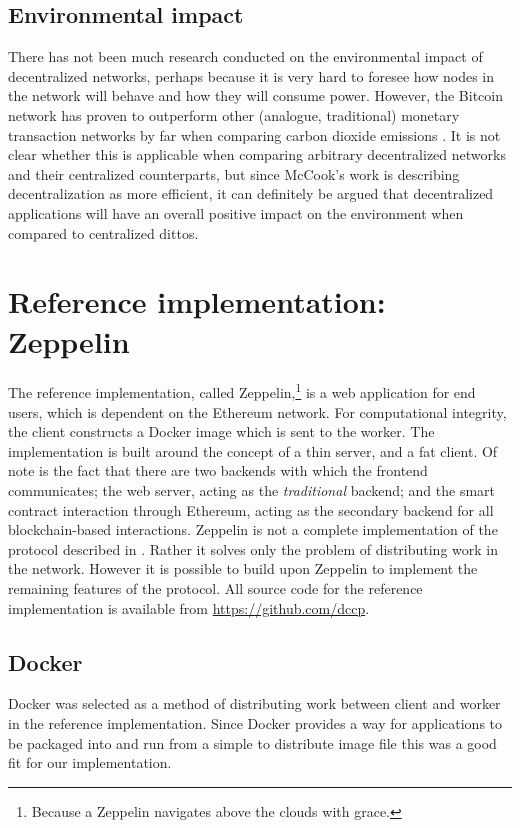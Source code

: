 \subsection{Environmental impact}
There has not been much research conducted on the environmental impact of decentralized networks, perhaps because it is very hard to foresee how nodes in the network will behave and how they will consume power. However, the Bitcoin network has proven to outperform other (analogue, traditional) monetary transaction networks by far when comparing carbon dioxide emissions \cite{cook}. It is not clear whether this is applicable when comparing arbitrary decentralized networks and their centralized counterparts, but since McCook's work is describing decentralization as more efficient, it can definitely be argued that decentralized applications will have an overall positive impact on the environment when compared to centralized dittos.

\section{Reference implementation: Zeppelin}
The reference implementation, called Zeppelin,\footnote{Because a Zeppelin navigates above the clouds with grace.} is a web application for end users, which is dependent on the Ethereum network. For computational integrity, the client constructs a Docker image which is sent to the worker. The implementation is built around the concept of a thin server, and a fat client. Of note is the fact that there are two backends with which the frontend communicates; the web server, acting as the \textit{traditional} backend; and the smart contract interaction through Ethereum, acting as the secondary backend for all blockchain-based interactions. Zeppelin is not a complete implementation of the protocol described in . Rather it solves only the problem of distributing work in the network. However it is possible to build upon Zeppelin to implement the remaining features of the protocol.
All source code for the reference implementation is available from \href{https://github.com/dccp}{https://github.com/dccp}.

\subsection{Docker}
Docker was selected as a method of distributing work between client and worker in the reference implementation. Since Docker provides a way for applications to be packaged into and run from a simple to distribute image file this was a good fit for our implementation.

